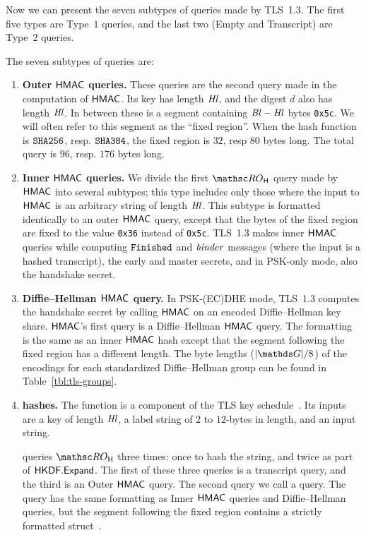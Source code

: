 Now we can present the seven subtypes of queries made by TLS~1.3. The first five types are Type~$1$ queries, and the last two (Empty and Transcript) are Type~$2$ queries.

The seven subtypes of queries are: 
\begin{enumerate}
	\item \textbf{Outer $\mathsf{HMAC}$ queries.}
	These queries are the second query made in the computation of $\mathsf{HMAC}$.
	Its key has length $\mathit{Hl}$, and the digest $d$ also has length $\mathit{Hl}$. 
	In between these is a segment containing $\mathit{Bl}-\mathit{Hl}$ bytes \texttt{0x5c}. 
	We will often refer to this segment as the ``fixed region''.  
	When the hash function is $\texttt{SHA{256}}$, resp. $\texttt{SHA{384}}$, the fixed region is $32$, resp $80$ bytes long. 
	The total query is $96$, resp. $176$ bytes long.
	
	\item \textbf{Inner $\mathsf{HMAC}$ queries.} We divide the first $\ROhash$ query made by $\mathsf{HMAC}$ into several subtypes; this type includes only those where the input to $\mathsf{HMAC}$ is an arbitrary string of length $\mathit{Hl}$.
	This subtype is formatted identically to an outer $\mathsf{HMAC}$ query, except that the bytes of the fixed region are fixed to the value \texttt{0x36} instead of \texttt{0x5c}.  
	TLS~1.3 makes inner $\mathsf{HMAC}$ queries while computing $\mathtt{Finished}$ and $\mathit{binder}$ messages (where the input is a hashed transcript), the early and master secrets, and in PSK-only mode, also the handshake secret.
	
	\item \textbf{Diffie--Hellman $\mathsf{HMAC}$ query.} In PSK-(EC)DHE mode, TLS~1.3 computes the handshake secret by calling $\mathsf{HMAC}$ on an encoded Diffie--Hellman key share. $\mathsf{HMAC}$'s first query is a Diffie--Hellman $\mathsf{HMAC}$ query. The formatting is the same as an inner $\mathsf{HMAC}$ hash except that the segment following the fixed region has a different length. The byte lengths ($|\G|/8$) of the encodings for each standardized Diffie--Hellman group can be found in Table~\ref{tbl:tls-groups}.

	\item \textbf{ hashes.} The  function is a component of the TLS key schedule~\cite[Section 7.1]{rfc8446}. Its inputs are a key of length $\mathit{Hl}$, a label string of $2$ to $12$-bytes in length, and an input  string. 
	
	 queries $\ROhash$ three times: once to hash the  string, and twice as part of $\mathsf{HKDF.Expand}$. 
	The first of these three queries is a transcript query, and the third is an Outer $\mathsf{HMAC}$ query.
	The second query we call a  query. 
	The  query has the same formatting as Inner $\mathsf{HMAC}$ queries and Diffie--Hellman queries, but the segment following the fixed region contains a strictly formatted  struct~\cite[Section 7.1]{rfc8446}.
	

\end{enumerate}
